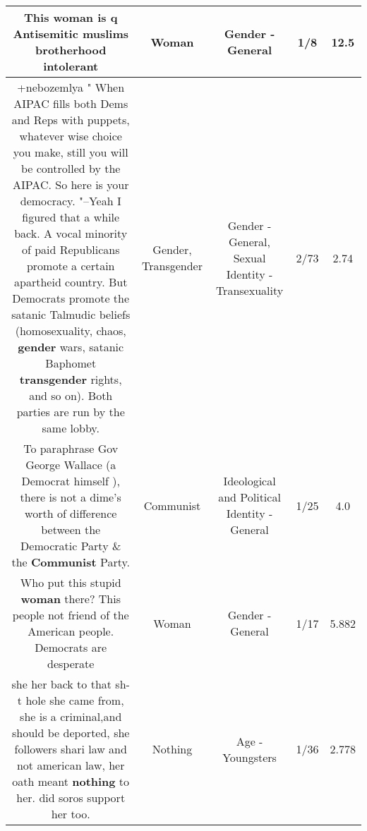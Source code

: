 \documentclass[11pt]{article}
\newlength\mylength
\begin{document}
\begin{center}
\begin{longtable}{|C{.65\mylength}|C{.30\mylength}|C{.12\mylength}|C{.12\mylength}|C{.12\mylength}|}
  \small This \textbf{woman} is q Antisemitic muslims brotherhood intolerant\normalsize   & Woman & Gender - General & 1/8 & 12.5 \\  \hline
  \small +nebozemlya " When AIPAC fills both Dems and Reps with puppets, whatever wise choice you make, still you will be controlled by the AIPAC. So here is your democracy. "--Yeah I figured that a while back. A vocal minority of paid Republicans promote a certain apartheid country. But Democrats promote the satanic Talmudic beliefs (homosexuality, chaos, \textbf{gender} wars, satanic Baphomet \textbf{transgender} rights, and so on). Both parties are run by the same lobby.\normalsize   & Gender, Transgender & Gender - General, Sexual Identity - Transexuality & 2/73 & 2.74 \\  \hline
  \small To paraphrase Gov George Wallace (a Democrat himself ), there is not a dime's worth of difference between the Democratic Party \& the \textbf{Communist} Party.\normalsize   & Communist &  Ideological and Political Identity - General & 1/25 & 4.0 \\  \hline
  \small Who put this stupid \textbf{woman} there? This people not friend of the American people. Democrats are desperate\normalsize   & Woman & Gender - General & 1/17 & 5.882 \\  \hline
  \small she her back to that sh-t hole she came from, she is a criminal,and should be deported, she followers shari law and not american law, her oath meant \textbf{nothing} to her. did soros support her too.\normalsize   & Nothing & Age - Youngsters & 1/36 & 2.778 \\  \hline

\end{longtable}
\end{center}
\end{document}
